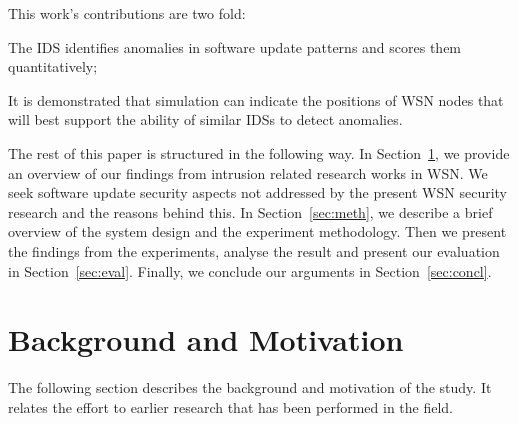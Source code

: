 \documentclass[conference]{IEEEtran}
\newcommand{\notedme}[1]{\raisebox{0pt}[0pt][0pt]{\pdfcomment[open=true,color=blue]{#1}}}
\begin{document}
This work's contributions are two fold: 
\begin{inparaenum}
\item  The IDS identifies anomalies in software update patterns and scores them quantitatively;
\item It is demonstrated that simulation can indicate the positions of WSN nodes that will best support the ability of similar IDSs to detect anomalies.
\end{inparaenum}

The rest of this paper is structured in the following way. 
In Section~\ref{sec:lit}, we provide an overview of our findings from intrusion related research works in WSN. 
We seek software update security aspects not addressed by the present WSN security research and the reasons behind this. 
In Section~\ref{sec:meth}, we describe a brief overview of the system  design and the experiment methodology. 
Then we  present the findings from the experiments, analyse the result and present our evaluation in Section~\ref{sec:eval}.  
Finally, we conclude our arguments in Section~\ref{sec:concl}.

\section{Background and Motivation}
\label{sec:lit}

The following section describes the background and motivation of the study.  It relates the effort to earlier research that has been performed in the field.
\end{document}
